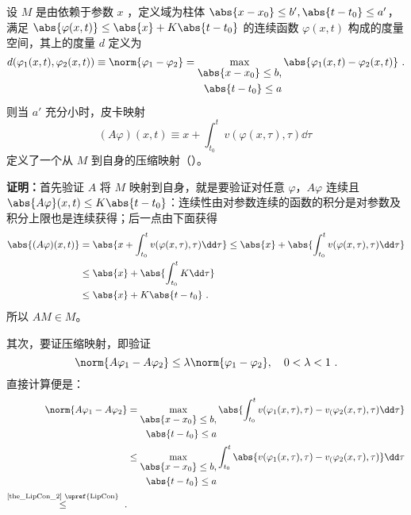 \begin{theorem}{}
设 $M$ 是由依赖于参数 $x$ ，定义域为柱体 $\abs{x-x_0}\leq b',\abs{t-t_0}\leq a'$，满足 $\abs{\varphi(x,t)}\leq \abs{x}+K\abs{t-t_0}$ 的连续函数 $\varphi(x,t)$ 构成的度量空间，其上的度量 $d$ 定义为
\begin{equation}
d(\varphi_1(x,t),\varphi_2(x,t))\equiv\norm{\varphi_1-\varphi_2}=\max_{\begin{aligned}\abs{x-x_0}\leq b,\\\abs{t-t_0}\leq a\end{aligned}}\abs{\varphi_1(x,t)-\varphi_2(x,t)}~.
\end{equation}
则当 $a'$ 充分小时，皮卡映射
\begin{equation}
(A\varphi)(x,t)\equiv x+\int_{t_0}^{t}v(\varphi(x,\tau),\tau)\dd \tau~
\end{equation}
定义了一个从 $M$ 到自身的压缩映射（）。
\end{theorem}
\textbf{证明：}首先验证 $A$ 将 $M$ 映射到自身，就是要验证对任意 $\varphi$，$A\varphi$ 连续且 $\abs{A\varphi}(x,t)\leq K\abs{t-t_0}$：连续性由对参数连续的函数的积分是对参数及积分上限也是连续获得；后一点由下面获得
\begin{equation}
\begin{aligned}
\abs{(A\varphi)(x,t)}&=\abs{x+\int_{t_0}^t v(\varphi(x,\tau),\tau)\dd \tau}\leq\abs{x}+\abs{\int_{t_0}^t v(\varphi(x,\tau),\tau)\dd \tau}\\
&\leq\abs{x}+\abs{\int_{t_0}^t K\dd \tau}\\
&\leq\abs{x}+K\abs{t-t_0}~.
\end{aligned}
\end{equation}
所以 $AM\in M$。

其次，要证压缩映射，即验证 
\begin{equation}
\norm{A\varphi_1-A\varphi_2}\leq\lambda\norm{\varphi_1-\varphi_2},\quad 0<\lambda<1~.
\end{equation}
直接计算便是：
\begin{equation}
\begin{aligned}
\norm{A\varphi_1-A\varphi_2}&=\max_{\begin{aligned}\abs{x-x_0}\leq b,\\\abs{t-t_0}\leq a\end{aligned}}\abs{\int_{t_0}^t v(\varphi_1(x,\tau),\tau)-v_(\varphi_2(x,\tau),\tau)\dd \tau}\\
&\leq\max_{\begin{aligned}\abs{x-x_0}\leq b,\\\abs{t-t_0}\leq a\end{aligned}}\int_{t_0}^t \abs{v(\varphi_1(x,\tau),\tau)-v_(\varphi_2(x,\tau),\tau)}\dd \tau\\
\overset{\text{\autoref{the_LipCon_2}~\upref{LipCon}}}{\leq}~.
\end{aligned}
\end{equation}


